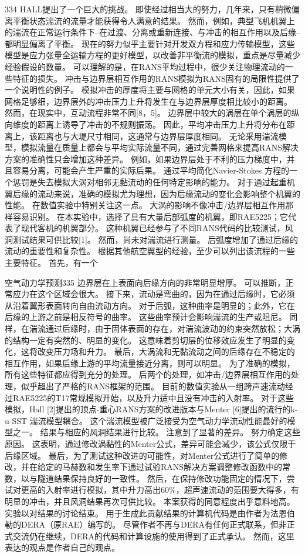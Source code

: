 \documentclass[UTF8,11pt,a4paper,openany,fontset=fandol]{ctexbook}
\begin{document}
334 HALL提出了一个巨大的挑战。 即使经过相当大的努力，几年来，只有稍微偏离平衡状态湍流的流量才能获得令人满意的结果。 然而，例如，典型飞机机翼上的湍流在正常运行条件下--在过渡、分离或重新连接、与冲击的相互作用以及后缘--都明显偏离了平衡。 现在的努力似乎主要针对开发双方程和应力传输模型，这些模型是应力张量全运输方程的更好模型，以改善非平衡流的模拟，重点是尽量减少经验假设的数量。 可以理解的是，在RANS平均过程中，很少关注物理流动的一些特征的损失。 冲击与边界层相互作用的RANS模拟为RANS固有的局限性提供了一个说明性的例子。 模拟冲击的厚度将主要与网格的单元大小有关，因此，如果网格足够细，边界层外的冲击压力上升将发生在与边界层厚度相比较小的距离。 然而，在现实中，互动流程非常不同[8，5]。 边界层中较大的涡层在单个涡层的纵向维度的距离上诱导了冲击的不规则振荡。 因此，平均冲击压力上升将分布在距离上，该距离也与大堤尺寸相同，这通常与边界层厚度相同。 无论采用湍流模型，模拟流量在质量上都会与平均实际流量不同，通过完善网格来提高RANS解决方案的准确性只会增加这种差异。 例如，如果边界层处于不利的压力梯度中，并且容易分离，可能会产生严重的实际后果。 通过平均简化Navier-Stokes 方程的一个惩罚是失去模拟大涡对相邻无黏流动的任何特定影响的能力。 对于通过起重机翼后缘的流动来说，准确的模拟尤为理想，因为后缘流动的变化会影响整个机翼的性能。 在数值实验中特别关注这一点。 大涡的影响不像冲击/边界层相互作用那样容易识别。 在本实验中，选择了具有大量后部弧度的机翼，即RAE5225；它代表了现代客机的机翼部分。 这种机翼已经参与了不同RANS代码的比较测试，风洞测试结果可供比较[1]。 然而，尚未对湍流进行测量。 后弧度增加了通过后缘的流动的重要性和复杂性。 根据其他航空翼型的经验，至少可以列出该流程的一些主要特征。 首先，有一个

空气动力学预测335 边界层在上表面向后缘方向的非常明显增厚。 可以推断，正常应力在这个区域会很大。 接下来，流动是弯曲的，因为在通过后缘时，它必须从沿着翼形表面转向自由流动方向。 对于后弧，这种曲率是明显的；此外，它在后缘的上游之前是相反符号的曲率。 这些曲率预计会影响湍流的生产或阻尼。 同样，在湍流通过后缘时，由于固体表面的存在，对湍流波动的约束突然放松；大涡的结构一定有突然的、明显的变化。 这意味着剪切层的位移效应发生了明显的变化，这将改变压力场和升力。 最后，大涡流和无黏流动之间的后缘存在不稳定的相互作用，如果后缘上游的平均流量接近分离，则可以明显。 为了准确的模拟，所有这些特征都应得到充分的处理。 后两个的处理，如冲击/边界层相互作用的处理，似乎超出了严格的RANS框架的范围。 目前的数值实验从一组跨声速流动经过RAE5225的T17常规模拟开始，以及升力适中且没有冲击的入射率。 对于这些模拟，Hall [2]提出的顶点-重心RANS方案的改进版本与Menter [6]提出的流行的k-u SST 湍流模型耦合。 这个湍流模型被广泛接受为空气动力学流动性能最好的模型之一。 结果与相应的风洞结果进行比较。 注意到了显著的差异。 努力确定这些原因。 这表明，通过修改涡黏性的Menter公式，差异可能会减少，该公式仅限于后缘区域。 最后，为了测试这种改进的可能性，对Menter公式进行了简单的修改，并在给定的马赫数和发生率下通过试验RANS解决方案调整修改函数中的常数，以与隧道结果保持良好的一致性。 然后，在保持修改功能固定的情况下，尝试对更高的入射率进行模拟，其中升力高出60\%，超声速流动的范围要大得多，有明显的冲击，并且风洞结果再次可供比较。 本案获得的同意程度出乎意料地高。 实验以对结果的讨论结束。 用于生成此贡献结果的计算机代码是由作者为法恩伯勒的DERA（原RAE）编写的。 尽管作者不再与DERA有任何正式联系，但非正式交流仍在继续，DERA的代码和计算设施的使用得到了正式承认。 然而，这里表达的观点是作者自己的观点。
\end{document}

